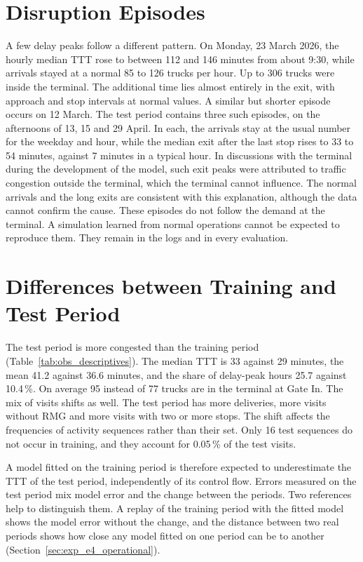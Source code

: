 \section{Disruption Episodes}
\label{sec:obs_episodes}

A few delay peaks follow a different pattern. On Monday, 23 March 2026,
the hourly median TTT rose to between 112 and 146 minutes from about
9:30, while arrivals stayed at a normal 85 to 126 trucks per hour. Up to
306 trucks were inside the terminal. The additional time lies almost
entirely in the exit, with approach and stop intervals at normal values.
A similar but shorter episode occurs on 12 March. The test period contains
three such episodes, on the afternoons of 13, 15 and 29 April. In each, the
arrivals stay at the usual number for the weekday and hour, while the median
exit after the last stop rises to 33 to 54 minutes, against 7 minutes in a
typical hour. In discussions with the terminal during the development of the
model, such exit peaks were attributed to traffic congestion outside the
terminal, which the terminal cannot influence. The normal arrivals and the long
exits are consistent with this explanation, although the data cannot confirm
the cause. These episodes do not follow the demand at the terminal. A simulation learned from normal
operations cannot be expected to reproduce them. They remain in the logs and in
every evaluation.

\section{Differences between Training and Test Period}
\label{sec:obs_drift}

The test period is more congested than the training period
(Table~\ref{tab:obs_descriptives}). The median TTT is 33 against 29 minutes, the
mean 41.2 against 36.6 minutes, and the share of delay-peak hours 25.7 against
10.4\,\%. On average 95 instead of 77 trucks are in the terminal at Gate In. The
mix of visits shifts as well. The test period has more deliveries, more visits
without RMG and more visits with two or more stops. The shift affects the
frequencies of activity sequences rather than their set. Only 16 test sequences do not
occur in training, and they account for 0.05\,\% of the test visits.



A model fitted on the training period is therefore expected to underestimate the
TTT of the test period, independently of its control flow. Errors measured on the
test period mix model error and the change between the periods. Two references
help to distinguish them. A replay of the training period with the fitted model
shows the model error without the change, and the distance between two real periods shows
how close any model fitted on one period can be to another
(Section~\ref{sec:exp_e4_operational}).

